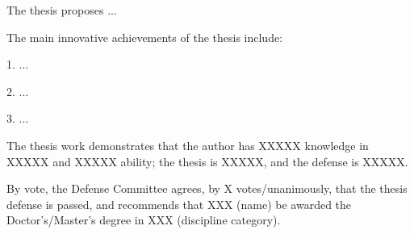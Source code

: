 
\begin{resolution}


  The thesis proposes ...


  The main innovative achievements of the thesis include:


  1. ...


  2. ...


  3. ...


  The thesis work demonstrates that the author has XXXXX knowledge in XXXXX and XXXXX ability; the thesis is XXXXX, and the defense is XXXXX.


  By vote, the Defense Committee agrees, by X votes/unanimously, that the thesis defense is passed, and recommends that XXX (name) be awarded the Doctor's/Master's degree in XXX (discipline category).

\end{resolution}
